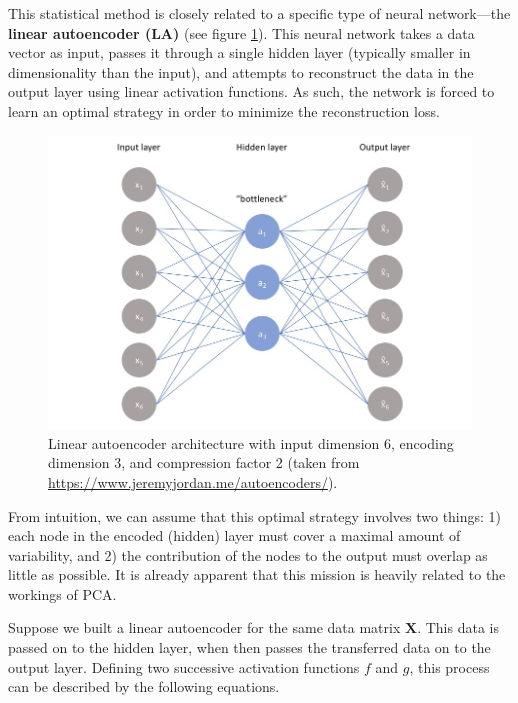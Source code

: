 This statistical method is closely related to a specific type of neural network---the \textbf{linear autoencoder (LA)} (see figure \ref{fig:linear_autoencoder}). This neural network takes a data vector as input, passes it through a single hidden layer (typically smaller in dimensionality than the input), and attempts to reconstruct the data in the output layer using linear activation functions. As such, the network is forced to learn an optimal strategy in order to minimize the reconstruction loss.

\begin{figure}[htbp]
	\begin{center}
		\includegraphics[width=\linewidth]{images/autoencoder.jpg}
		\caption{Linear autoencoder architecture with input dimension 6, encoding dimension 3, and compression factor 2 (taken from \textcolor{blue}{\url{https://www.jeremyjordan.me/autoencoders/}}).}
		\label{fig:linear_autoencoder}
	\end{center}
\end{figure}

From intuition, we can assume that this optimal strategy involves two things: 1) each node in the encoded (hidden) layer must cover a maximal amount of variability, and 2) the contribution of the nodes to the output must overlap as little as possible. It is already apparent that this mission is heavily related to the workings of PCA. 

Suppose we built a linear autoencoder for the same data matrix $\mathbf{X}$. This data is passed on to the hidden layer, when then passes the transferred data on to the output layer. Defining two successive activation functions $f$ and $g$, this process can be described by the following equations.

